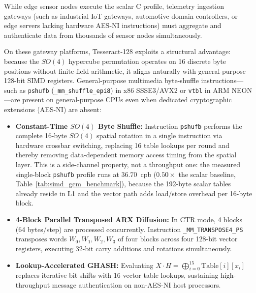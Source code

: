 \documentclass[review,12pt]{elsarticle}
\begin{document}
While edge sensor nodes execute the scalar C profile, telemetry ingestion gateways (such as industrial IoT gateways, automotive domain controllers, or edge servers lacking hardware AES-NI instructions) must aggregate and authenticate data from thousands of sensor nodes simultaneously. 

On these gateway platforms, Tesseract-128 exploits a structural advantage: because the $SO(4)$ hypercube permutation operates on 16 discrete byte positions without finite-field arithmetic, it aligns naturally with general-purpose 128-bit SIMD registers. General-purpose multimedia byte-shuffle instructions---such as \texttt{pshufb} (\texttt{\_mm\_shuffle\_epi8}) in x86 SSSE3/AVX2 or \texttt{vtbl} in ARM NEON---are present on general-purpose CPUs even when dedicated cryptographic extensions (AES-NI) are absent:
\begin{itemize}
    \item \textbf{Constant-Time $SO(4)$ Byte Shuffle:} Instruction \texttt{pshufb} performs the complete 16-byte $SO(4)$ spatial rotation in a single instruction via hardware crossbar switching, replacing 16 table lookups per round and thereby removing data-dependent memory access timing from the spatial layer. This is a side-channel property, not a throughput one: the measured single-block \texttt{pshufb} profile runs at $36.70$~cpb ($0.50\times$ the scalar baseline, Table~\ref{tab:simd_gcm_benchmark}), because the 192-byte scalar tables already reside in L1 and the vector path adds load/store overhead per 16-byte block.
    \item \textbf{4-Block Parallel Transposed ARX Diffusion:} In CTR mode, 4 blocks (64 bytes/step) are processed concurrently. Instruction \texttt{\_MM\_}\allowbreak\texttt{TRANSPOSE4\_PS} transposes words $W_0, W_1, W_2, W_3$ of four blocks across four 128-bit vector registers, executing 32-bit carry additions and rotations simultaneously.
    \item \textbf{Lookup-Accelerated GHASH:} Evaluating $X \cdot H = \bigoplus_{i=0}^{15} \text{Table}[i][x_i]$ replaces iterative bit shifts with 16 vector table lookups, sustaining high-throughput message authentication on non-AES-NI host processors.
\end{itemize}
\end{document}
